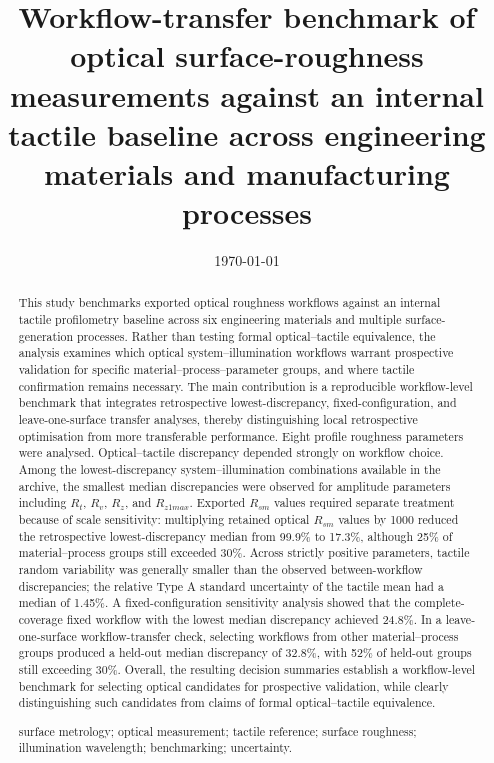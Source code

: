 \documentclass{article}
\begin{document}
	\title{Workflow-transfer benchmark of optical surface-roughness measurements against an internal tactile baseline across engineering materials and manufacturing processes}
\author{}
\vspace{-5mm}
\date{\today\\\vspace{2mm}}
\maketitle
\onehalfspacing
\linenumbers
\begin{abstract}
This study benchmarks exported optical roughness workflows against an internal tactile profilometry baseline across six engineering materials and multiple surface-generation processes. Rather than testing formal optical–tactile equivalence, the analysis examines which optical system–illumination workflows warrant prospective validation for specific material–process–parameter groups, and where tactile confirmation remains necessary. The main contribution is a reproducible workflow-level benchmark that integrates retrospective lowest-discrepancy, fixed-configuration, and leave-one-surface transfer analyses, thereby distinguishing local retrospective optimisation from more transferable performance.
Eight profile roughness parameters were analysed. Optical–tactile discrepancy depended strongly on workflow choice. Among the lowest-discrepancy system–illumination combinations available in the archive, the smallest median discrepancies were observed for amplitude parameters including $R_t$, $R_v$, $R_z$, and $R_{z1max}$. Exported $R_{sm}$ values required separate treatment because of scale sensitivity: multiplying retained optical $R_{sm}$ values by 1000 reduced the retrospective lowest-discrepancy median from 99.9\% to 17.3\%, although 25\% of material–process groups still exceeded 30\%.
Across strictly positive parameters, tactile random variability was generally smaller than the observed between-workflow discrepancies; the relative Type A standard uncertainty of the tactile mean had a median of 1.45\%. A fixed-configuration sensitivity analysis showed that the complete-coverage fixed workflow with the lowest median discrepancy achieved 24.8\%. In a leave-one-surface workflow-transfer check, selecting workflows from other material–process groups produced a held-out median discrepancy of 32.8\%, with 52\% of held-out groups still exceeding 30\%.
Overall, the resulting decision summaries establish a workflow-level benchmark for selecting optical candidates for prospective validation, while clearly distinguishing such candidates from claims of formal optical–tactile equivalence.

 surface metrology; optical measurement; tactile reference; surface roughness; illumination wavelength; benchmarking; uncertainty.
\end{abstract}
\end{document}
